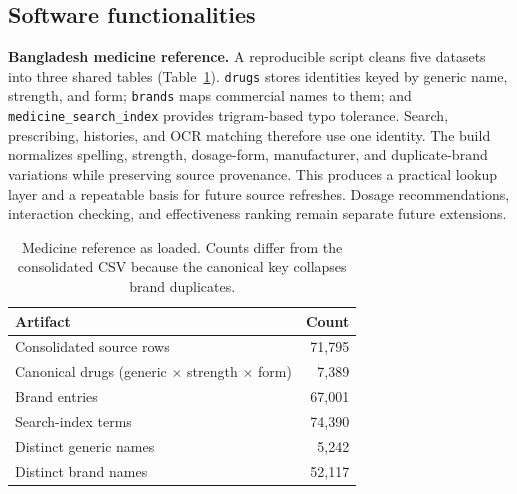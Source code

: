 \documentclass[preprint,12pt,a4paper]{elsarticle}
\begin{document}
\subsection{Software functionalities}

\textbf{Bangladesh medicine reference.} A reproducible script cleans five datasets into
three shared tables (Table~\ref{tab:corpus}). \texttt{drugs} stores identities keyed by
generic name, strength, and form; \texttt{brands} maps commercial names to them; and
\texttt{medicine\_search\_index} provides trigram-based typo tolerance. Search, prescribing,
histories, and OCR matching therefore use one identity. The build normalizes spelling,
strength, dosage-form, manufacturer, and duplicate-brand variations while preserving source
provenance. This produces a practical lookup layer and a repeatable basis for future source
refreshes. Dosage recommendations, interaction checking, and effectiveness ranking remain
separate future extensions.

\begin{table}[!tb]
\centering
\small

\renewcommand{\arraystretch}{1.15}
\setlength{\tabcolsep}{6pt}

\begin{tabular}{@{}lr@{}}

\toprule
\textbf{Artifact} & \textbf{Count} \\
\midrule

Consolidated source rows
& 71{,}795 \\[2pt]

Canonical drugs (generic $\times$ strength $\times$ form)
& 7{,}389 \\[2pt]

Brand entries
& 67{,}001 \\[2pt]

Search-index terms
& 74{,}390 \\[2pt]

Distinct generic names
& 5{,}242 \\[2pt]

Distinct brand names
& 52{,}117 \\

\bottomrule

\end{tabular}

\caption{Medicine reference as loaded. Counts differ from the consolidated CSV because the canonical key collapses brand duplicates.}

\label{tab:corpus}
\end{table}
\end{document}
